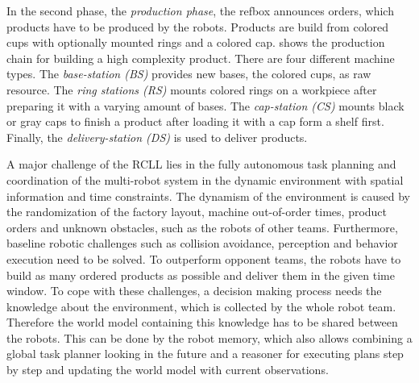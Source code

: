 In the second phase, the \emph{production phase}, the refbox announces
orders, which products have to be produced by the robots. Products
are build from colored cups with optionally mounted rings and a
colored cap.   shows the production chain for
building a high complexity product.  There are four different machine
types. The \emph{base-station (BS)} provides new bases, the colored
cups, as raw resource. The \emph{ring stations (RS)} mounts colored
rings on a workpiece after preparing it with a varying amount of
bases.  The \emph{cap-station (CS)} mounts black or gray caps to
finish a product after loading it with a cap form a shelf first.
Finally, the \emph{delivery-station (DS)} is used to deliver products.

A major challenge of the RCLL lies in the fully autonomous task
planning and coordination of the multi-robot system in the dynamic
environment with spatial information and time constraints. The
dynamism of the environment is caused by the randomization of the factory
layout, machine out-of-order times, product orders and
unknown obstacles, such as the robots of other teams. Furthermore,
baseline robotic challenges such as collision avoidance, perception
and behavior execution need to be solved. To outperform opponent
teams, the robots have to build as many ordered products as possible
and deliver them in the given time window. To cope with these
challenges, a decision making process needs the knowledge about the
environment, which is collected by the whole robot team. Therefore the
world model containing this knowledge has to be shared between the robots.
This can be done by the robot memory, which also allows
combining a global task planner looking in the future and a reasoner
for executing plans step by step and updating the world model with
current observations.

